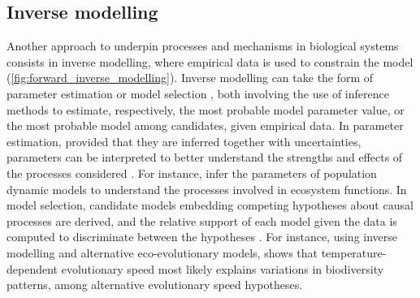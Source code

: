 \subsection{Inverse modelling}
Another approach to underpin processes and mechanisms in biological systems consists in inverse modelling, where empirical data is used to constrain the model (\cref{fig:forward_inverse_modelling}).
% 
% 
% 
Inverse modelling can take the form of parameter estimation \citep{Schartau2017} or model selection \citep{Johnson2004}, both involving the use of inference methods to estimate, respectively, the most probable model parameter value, or the most probable model among candidates, given empirical data.
% 
% 
% 
% 
In parameter estimation, provided that they are inferred together with uncertainties, parameters can be interpreted to better understand the strengths and effects of the processes considered \citep{Pontarp2019}. For instance, \cite{Higgins2010,Curtsdotter2019} infer the parameters of population dynamic models to understand the processes involved in ecosystem functions.
%
In model selection, candidate models embedding competing hypotheses about causal processes are derived, and the relative support of each model given the data is computed to discriminate between the hypotheses \citep{Johnson2004}. For instance, using inverse modelling and alternative eco-evolutionary models, \citep{Skeels2022} shows that temperature-dependent evolutionary speed most likely explains variations in biodiversity patterns, among alternative evolutionary speed hypotheses.

